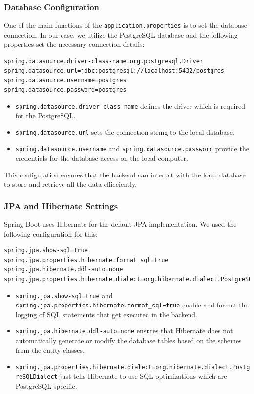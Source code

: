        \subsubsection{Database Configuration}
        One of the main functions of the \texttt{application.properties} is to set the database connection. In our case, we utilize the PostgreSQL database and the following properties set the necessary connection details:
        \lstset{style=mycsharp, caption=Database Configuration}
        \begin{lstlisting}
spring.datasource.driver-class-name=org.postgresql.Driver
spring.datasource.url=jdbc:postgresql://localhost:5432/postgres
spring.datasource.username=postgres
spring.datasource.password=postgres
        \end{lstlisting}
        \begin{itemize}
            \item \texttt{spring.datasource.driver-class-name} defines the driver which is required for the PostgreSQL.
            \item \texttt{spring.datasource.url} sets the connection string to the local database.
            \item \texttt{spring.datasource.username} and \texttt{spring.datasource.password} provide the credentials for the database access on the local computer.
        \end{itemize}
        This configuration ensures that the backend can interact with the local database to store and retrieve all the data effieciently.

        \subsubsection{JPA and Hibernate Settings}
        Spring Boot uses Hibernate for the default JPA implementation. We used the following configuration for this:
        \lstset{style=mycsharp, caption=JPA/Hibernate Settings}
        \begin{lstlisting}
spring.jpa.show-sql=true
spring.jpa.properties.hibernate.format_sql=true
spring.jpa.hibernate.ddl-auto=none
spring.jpa.properties.hibernate.dialect=org.hibernate.dialect.PostgreSQLDialect
        \end{lstlisting} 

        \begin{itemize}
            \item \texttt{spring.jpa.show-sql=true} and \verb|spring.jpa.properties.hibernate.format_sql=true| enable and format the logging of SQL statements that get executed in the backend.
            \item \texttt{spring.jpa.hibernate.ddl-auto=none} ensures that Hibernate does not automatically generate or modify the database tables based on the schemes from the entity classes.
            \item \texttt{spring.jpa.properties.hibernate.dialect=org.hibernate.dialect.PostgreSQLDialect} just tells Hibernate to use SQL optimizations which are PostgreSQL-specific.
        \end{itemize}
        
